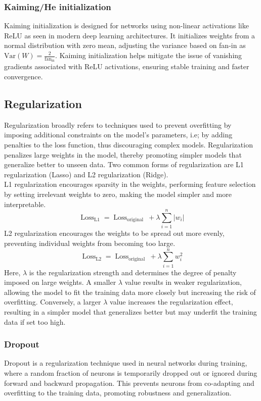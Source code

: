 \subsubsection{Kaiming/He initialization}
Kaiming initialization is designed for networks using non-linear activations like ReLU as seen in modern deep learning architectures. It initializes weights from a normal distribution with zero mean, adjusting the variance based on fan-in as $ \text{Var}(W) = \frac{2}{\text{fan}_{\text{in}}}$. Kaiming initialization helps mitigate the issue of vanishing gradients associated with ReLU activations, ensuring stable training and faster convergence.
\subsection{Regularization}
Regularization broadly refers to techniques used to prevent overfitting by imposing additional constraints on the model's parameters, i.e; by adding penalties to the loss function, thus discouraging complex models. Regularization penalizes large weights in the model, thereby promoting simpler models that generalize better to unseen data. Two common forms of regularization are L1 regularization (Lasso) and L2 regularization (Ridge). \\
L1 regularization encourages sparsity in the weights, performing feature selection by setting irrelevant weights to zero, making the model simpler and more interpretable. 
\[ \operatorname{Loss}_{\mathrm{L} 1}=\operatorname{Loss}_{\text {original }}+\lambda \sum_{i=1}^n\left|w_i\right| \]
L2 regularization encourages the weights to be spread out more evenly, preventing individual weights from becoming too large.
\[ \operatorname{Loss}_{\mathrm{L} 2}=\operatorname{Loss}_{\text {original }}+\lambda \sum_{i=1}^n w^2_i \]
Here, $\lambda$ is the regularization strength and determines the degree of penalty imposed on large weights. A smaller $\lambda$ value results in weaker regularization, allowing the model to fit the training data more closely but increasing the risk of overfitting. Conversely, a larger $\lambda$ value increases the regularization effect, resulting in a simpler model that generalizes better but may underfit the training data if set too high.
\subsubsection{Dropout}
Dropout is a regularization technique used in neural networks during training, where a random fraction of neurons is temporarily dropped out or ignored during forward and backward propagation. This prevents neurons from co-adapting and overfitting to the training data, promoting robustness and generalization. 
